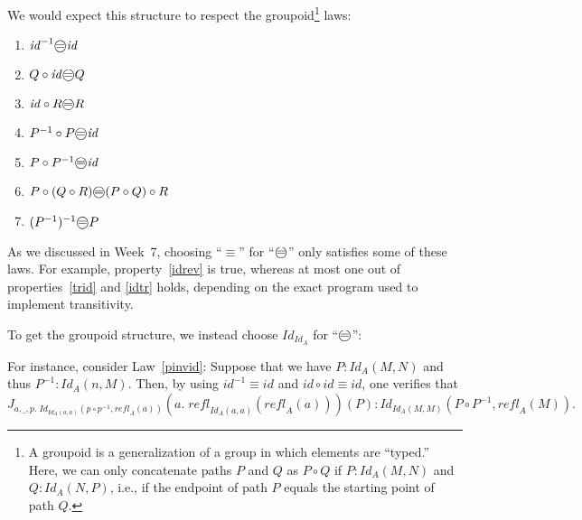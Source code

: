 \documentclass{article} \usepackage{chtt-notes} \usepackage{stmaryrd}
\newcommand{\circled}[1]{\text{\textcircled{#1}}}
\begin{document}
We would expect this structure to respect the groupoid\footnote{A groupoid is a generalization of a group in which elements are ``typed.'' Here, we can only concatenate paths $P$ and $Q$ as $P \circ Q$ if $P : \mathit{Id}_A(M, N)$ and $Q : \mathit{Id}_A(N, P)$, i.e., if the endpoint of path $P$ equals the starting point of path $Q$.} laws:
\begin{enumerate}
    \item \label{idrev} $\mathit{id}^{-1} \circled{=} \mathit{id}$
    \item \label{trid} $Q \circ \mathit{id} \circled{=} Q$
    \item \label{idtr} $\mathit{id} \circ R \circled{=} R$
    \item $P^{-1} \circ P \circled{=} \mathit{id}$
    \item \label{pinvid} $P \circ P^{-1} \circled{=} \mathit{id}$
    \item \label{assoc} $P \circ (Q \circ R) \circled{=} (P \circ Q) \circ R$
    \item $(P^{-1})^{-1} \circled{=} P$
\end{enumerate}
As we discussed in Week~7, choosing ``$\equiv$'' for ``$\circled{=}$'' only satisfies some of these laws.
For example, property~\ref{idrev} is true, whereas at most one out of properties~\ref{trid} and \ref{idtr} holds, depending on the exact program used to implement transitivity.

To get the groupoid structure, we instead choose $\mathit{Id}_{\mathit{Id}_A}$ for ``$\circled{=}$'':

For instance, consider Law~\ref{pinvid}:
Suppose that we have $P : \mathit{Id}_A(M, N)$ and thus $P^{-1} : \mathit{Id}_A(n, M)$.
Then, by using $\mathit{id}^{-1} \equiv \mathit{id}$ and $\mathit{id} \circ \mathit{id} \equiv \mathit{id}$, one verifies that
\[J_{a,\_,p.\; \mathit{Id}_{\mathit{Id}_A(a,a)}(p \circ p^{-1}, \mathit{refl}_A(a))}(a.\; \mathit{refl}_{\mathit{Id}_A(a,a)}(\mathit{refl}_A(a)))(P) : \mathit{Id}_{\mathit{Id}_A(M, M)}(P \circ P^{-1}, \mathit{refl}_A(M)).\]
\end{document}
